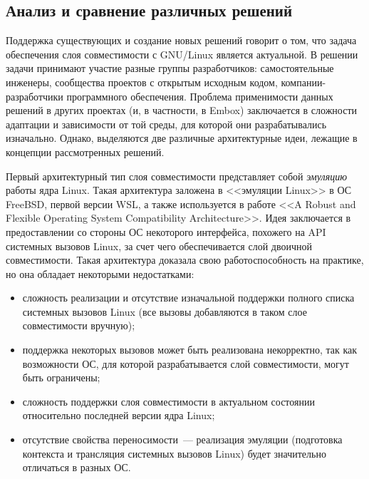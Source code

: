 
\subsection{Анализ и сравнение различных решений}

Поддержка существующих и создание новых решений говорит о том, что задача обеспечения слоя совместимости с GNU/Linux является актуальной. В решении задачи принимают участие разные группы разработчиков: самостоятельные инженеры, сообщества проектов с открытым исходным кодом, компании-разработчики программного обеспечения. Проблема применимости данных решений в других проектах (и, в частности, в Embox) заключается в сложности адаптации и зависимости от той среды, для которой они разрабатывались изначально. Однако, выделяются две различные архитектурные идеи, лежащие в концепции рассмотренных решений.

Первый архитектурный тип слоя совместимости представляет собой \textit{эмуляцию} работы ядра Linux. Такая архитектура заложена в <<эмуляции Linux>> в ОС FreeBSD, первой версии WSL, а также используется в работе <<A Robust and Flexible Operating System
Compatibility Architecture>>. Идея заключается в предоставлении со стороны ОС некоторого интерфейса, похожего на API системных вызовов Linux, за счет чего обеспечивается слой двоичной совместимости. Такая архитектура доказала свою работоспособность на практике, но она обладает некоторыми недостатками:
\begin{itemize}
    \item сложность реализации и отсутствие изначальной поддержки полного списка системных вызовов Linux (все вызовы добавляются в таком слое совместимости вручную);
    \item поддержка некоторых вызовов может быть реализована некорректно, так как возможности ОС, для которой разрабатывается слой совместимости, могут быть ограничены;
    \item сложность поддержки слоя совместимости в актуальном состоянии относительно последней версии ядра Linux;
    \item отсутствие свойства переносимости~--- реализация эмуляции (подготовка контекста и трансляция системных вызовов Linux) будет значительно отличаться в разных ОС.
\end{itemize}

